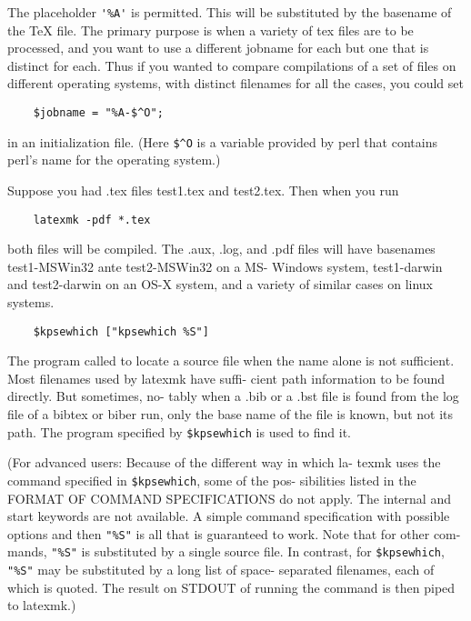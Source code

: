 The  placeholder  \verb|'%A'| is permitted. This will be substituted by
the basename of the TeX file.  The primary  purpose  is  when  a
variety  of tex files are to be processed, and you want to use a
different jobname for each but one that is  distinct  for  each.
Thus  if you wanted to compare compilations of a set of files on
different operating systems, with distinct filenames for all the
cases, you could set

\begin{verbatim}
	$jobname = "%A-$^O";
\end{verbatim}

in  an initialization file.  (Here \verb|$^O| is a variable provided by perl
that contains perl's name for the operating system.)

Suppose you had .tex files test1.tex and test2.tex.   Then  when you run

\begin{verbatim}
	latexmk -pdf *.tex
\end{verbatim}

both  files  will  be  compiled.  The .aux, .log, and .pdf files will have
basenames test1-MSWin32 ante test2-MSWin32  on  a  MS- Windows system,
test1-darwin and test2-darwin on an OS-X system, and a variety of similar cases
on linux systems.


\begin{verbatim}
	$kpsewhich ["kpsewhich %S"]
\end{verbatim}

The program called to locate a source file when the  name  alone
is  not  sufficient.  Most filenames used by latexmk have suffi-
cient path information to be found directly.  But sometimes, no-
tably when a .bib or a .bst file is found from the log file of a
bibtex or biber run, only the base name of the  file  is  known,
but not its path. The program specified by \verb|$kpsewhich| is used to
find it.

(For advanced users: Because of the different way in  which  la-
texmk uses the command specified in \verb|$kpsewhich|, some of the pos-
sibilities listed in the FORMAT OF COMMAND SPECIFICATIONS do not
apply.   The  internal  and  start keywords are not available. A
simple command specification with possible options and then \verb|"%S"|
is  all  that  is  guaranteed to work.  Note that for other com-
mands, \verb|"%S"| is substituted by a single source file. In contrast,
for \verb|$kpsewhich|, \verb|"%S"| may be substituted by a long list of space-
separated filenames, each of which is  quoted.   The  result  on
STDOUT of running the command is then piped to latexmk.)

